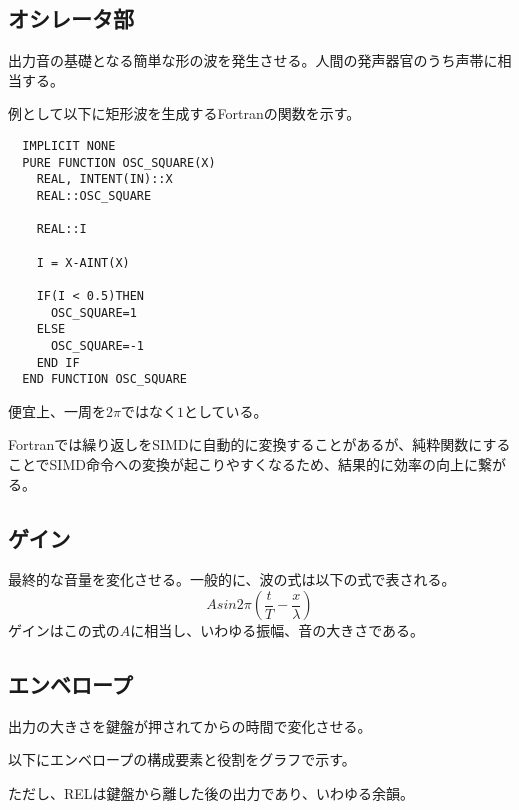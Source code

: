 \documentclass[dvipdfmx]{ujarticle}
\begin{document}
\subsection{オシレータ部}
出力音の基礎となる簡単な形の波を発生させる。人間の発声器官のうち声帯に相当する。\par
例として以下に矩形波を生成するFortranの関数を示す。\par
\begin{lstlisting}
  IMPLICIT NONE
  PURE FUNCTION OSC_SQUARE(X)
    REAL, INTENT(IN)::X
    REAL::OSC_SQUARE

    REAL::I

    I = X-AINT(X)

    IF(I < 0.5)THEN
      OSC_SQUARE=1
    ELSE
      OSC_SQUARE=-1
    END IF
  END FUNCTION OSC_SQUARE  
\end{lstlisting}
便宜上、一周を$2\pi$ではなく$1$としている。\par
Fortranでは繰り返しをSIMDに自動的に変換することがあるが、純粋関数にすることでSIMD命令への変換が起こりやすくなるため、結果的に効率の向上に繋がる。
\subsection{ゲイン}
最終的な音量を変化させる。一般的に、波の式は以下の式で表される。
$$Asin2\pi(\frac{t}{T}-\frac{x}{\lambda})$$
ゲインはこの式の$A$に相当し、いわゆる振幅、音の大きさである。
\subsection{エンベロープ}
出力の大きさを鍵盤が押されてからの時間で変化させる。\par
以下にエンベロープの構成要素と役割をグラフで示す。\par
{}\par
ただし、RELは鍵盤から離した後の出力であり、いわゆる余韻。
\end{document}
